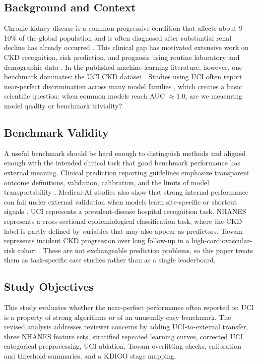 \documentclass[12pt]{article}
\begin{document}
\subsection{Background and Context}
Chronic kidney disease is a common progressive condition that affects about 9--10\% of the global population and is often diagnosed after substantial renal decline has already occurred \cite{bikbov2020,levey2012}. This clinical gap has motivated extensive work on CKD recognition, risk prediction, and prognosis using routine laboratory and demographic data \cite{islam2023,chittora2021,dritsas2022,halder2024,chen2025,li2025,shu2026}. In the published machine-learning literature, however, one benchmark dominates: the UCI CKD dataset \cite{rubini2015}. Studies using UCI often report near-perfect discrimination across many model families \cite{salekin2016,chittora2021,ganie2023}, which creates a basic scientific question: when common models reach AUC $\approx 1.0$, are we measuring model quality or benchmark triviality?

\subsection{Benchmark Validity}
A useful benchmark should be hard enough to distinguish methods and aligned enough with the intended clinical task that good benchmark performance has external meaning. Clinical prediction reporting guidelines emphasize transparent outcome definitions, validation, calibration, and the limits of model transportability \cite{collins2024}. Medical-AI studies also show that strong internal performance can fail under external validation when models learn site-specific or shortcut signals \cite{zech2018,geirhos2020,ongly2024,hill2024}. UCI represents a prevalent-disease hospital recognition task. NHANES represents a cross-sectional epidemiological classification task, where the CKD label is partly defined by variables that may also appear as predictors. Tawam represents incident CKD progression over long follow-up in a high-cardiovascular-risk cohort \cite{alshamsi2018}. These are not exchangeable prediction problems, so this paper treats them as task-specific case studies rather than as a single leaderboard.

\subsection{Study Objectives}
This study evaluates whether the near-perfect performance often reported on UCI is a property of strong algorithms or of an unusually easy benchmark. The revised analysis addresses reviewer concerns by adding UCI-to-external transfer, three NHANES feature sets, stratified repeated learning curves, corrected UCI categorical preprocessing, UCI ablation, Tawam overfitting checks, calibration and threshold summaries, and a KDIGO stage mapping.
\end{document}
